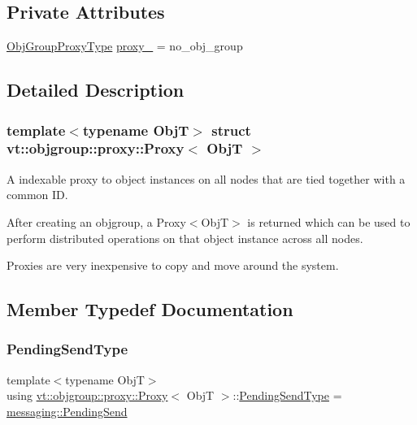 \subsection*{Private Attributes}
\begin{DoxyCompactItemize}
\item 
\hyperlink{namespacevt_ad7cae989df485fccca57f0792a880a8e}{Obj\+Group\+Proxy\+Type} \hyperlink{structvt_1_1objgroup_1_1proxy_1_1_proxy_a4411a5c2a4719d264060041fd15d9d03}{proxy\+\_\+} = no\+\_\+obj\+\_\+group
\end{DoxyCompactItemize}


\subsection{Detailed Description}
\subsubsection*{template$<$typename ObjT$>$\newline
struct vt\+::objgroup\+::proxy\+::\+Proxy$<$ Obj\+T $>$}

A indexable proxy to object instances on all nodes that are tied together with a common ID. 

After creating an objgroup, a Proxy$<$\+Obj\+T$>$ is returned which can be used to perform distributed operations on that object instance across all nodes.

Proxies are very inexpensive to copy and move around the system. 

\subsection{Member Typedef Documentation}
\mbox{\label{structvt_1_1objgroup_1_1proxy_1_1_proxy_a1bdf8713203531d306702a024872bb08}} 
\subsubsection{\texorpdfstring{Pending\+Send\+Type}{PendingSendType}}
{\footnotesize\ttfamily template$<$typename ObjT$>$ \\
using \hyperlink{structvt_1_1objgroup_1_1proxy_1_1_proxy}{vt\+::objgroup\+::proxy\+::\+Proxy}$<$ ObjT $>$\+::\hyperlink{structvt_1_1objgroup_1_1proxy_1_1_proxy_a1bdf8713203531d306702a024872bb08}{Pending\+Send\+Type} =  \hyperlink{structvt_1_1messaging_1_1_pending_send}{messaging\+::\+Pending\+Send}}

